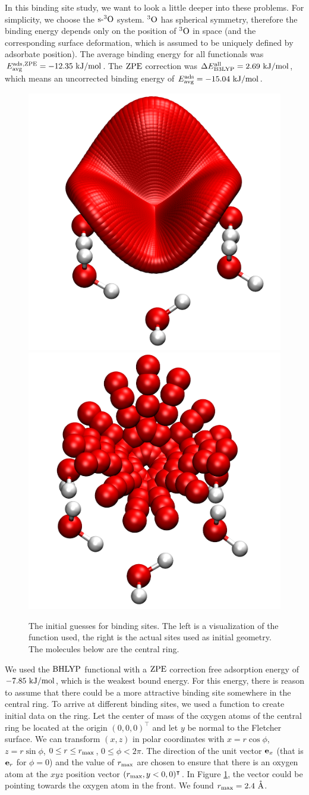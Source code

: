 \documentclass[8.5pt,twoside,twocolumn]{article}
\newcommand\zpe{\enmat{\te{ZPE}}}
\newcommand\eall{\enmat{E^{\te{all}}}}
\newcommand\sur{\enmat{\te{s-}}}
\renewcommand{\Ang}{\mathring{\te{A}}}
\newcommand\tripo{\enmat{{^3\te{O}}}}
\newcommand\kmo{\enmat{\te {kJ/mol}}}
\theoremstyle{standard}
\begin{document}
In this binding site study, we want to look a little deeper into these problems. For
simplicity, we choose the $\sur\tripo$ system. $\tripo$ has spherical symmetry, 
therefore the binding energy depends only on the position of $\tripo$ in space
(and the corresponding surface deformation, which is assumed to be uniquely
defined by adsorbate position).
The average binding energy for
all functionals was \mbox{$\avg{^{\te{,ZPE}}}=-12.35~\kmo$}. The $\zpe$ correction was
\mbox{$\Dl\eall_{\btlyp}=2.69~\kmo$}, which means an uncorrected binding energy
of \mbox{$\avg=-15.04~\kmo$}.

\begin{figure}[b!]
\includegraphics[width=.24\textwidth]{./img/SiteSnapshotMany.png}
\includegraphics[width=.24\textwidth]{./img/SiteSnapshotOriginal.png}
\caption{The initial guesses for binding sites. The left is a visualization of the function
used, the right is the actual sites used as initial geometry. The molecules
below are the central ring.}
\label{Fig:Adv:BindingSitesGuess}
\end{figure}

We used the $\text{BHLYP}$ functional with a $\zpe$ correction free adsorption energy 
of $-7.85~\kmo$, which is the weakest bound energy. For this energy,
there is reason to assume that there could be a more attractive binding site
somewhere in the central ring. To arrive at different binding sites, we used
a function to create initial data on the ring. Let the center of mass of the oxygen
atoms of the central ring be located at the origin $(0,0,0)^{\intercal}$ and let $y$ be
normal to the Fletcher surface. We can transform $(x,z)$ in polar coordinates with
$x=r \cos \phi$, $z=r \sin\phi$, $0 \leq r \leq r_{\text{max}}$, $0 \leq \phi<2\pi$. The direction of the
unit vector $\mathbf{e}_x$ (that is $\mathbf{e}_r$ for $\phi=0$) and the value of $r_{\text{max}}$ are
chosen to ensure that there is an oxygen atom at the $xyz$ position
vector \mbox{$(r_{\text{max}},y < 0,0)^{\intercal}$}. In Figure
\ref{Fig:Adv:BindingSitesGuess}, the vector could be pointing towards the oxygen
atom in the front. We found $\rmax=2.4~\Ang$.
\end{document}

